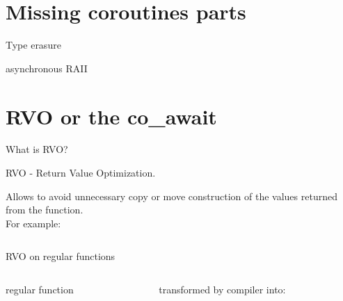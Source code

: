\documentclass[10pt]{beamer}
\begin{document}
\section{Missing coroutines parts}

\begin{frame}{Type erasure}
	

\end{frame}

\begin{frame}{asynchronous RAII}

\end{frame}


\section{RVO or the co\_await}

\begin{frame}{What is RVO?}
\centerline{\alert{RVO} - Return Value Optimization.}

\vfill

Allows to avoid unnecessary copy or move construction of the values returned from the function. \\
\pause
For example:


\inputminted[frame=single]{c++}{code-examples/RVO_examples/example.cpp}



\end{frame}

\begin{frame}[fragile]{RVO on regular functions}

\begin{columns}[T]
\begin{column}{0.4\linewidth}
\centerline{regular function}
\vfill
\inputminted{c++}{code-examples/RVO_examples/regular_function_rvo.cpp}
\vfill
\end{column}
\begin{column}{0.55\linewidth}
\centerline{transformed by compiler into:}
\vfill
\inputminted{c++}{code-examples/RVO_examples/transformed_function_rvo.cpp}
\vfill
\end{column}
\end{columns}

\end{frame}
\end{document}
